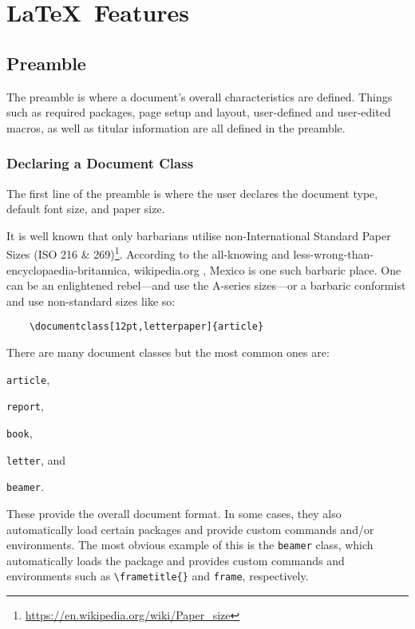 \chapter{\LaTeX~Features}
%
\section{Preamble}\label{s:p}
%
The preamble is where a document's overall characteristics are
defined.  Things such as required packages, page setup and layout,
user-defined and user-edited macros, as well as titular information
are all defined in the preamble.
%
\subsection{Declaring a Document Class}
%
The first line of the preamble is where the user declares the document
type, default font size, and paper size.

It is well known that only barbarians utilise non-International
Standard Paper Sizes (ISO 216 \&
269)\footnote{\url{https://en.wikipedia.org/wiki/Paper_size}}.
According to the all-knowing and
less-wrong-than-encyclopaedia-britannica, wikipedia.org
\cite{wikipediavsbritannica1,wikipediavsbritannica2,wikipediavsbritannica3},
Mexico is one such barbaric place.  One can be an enlightened
rebel---and use the A-series sizes---or a barbaric conformist and use
non-standard sizes like so:
\begin{verbatim}
	\documentclass[12pt,letterpaper]{article}
\end{verbatim}

There are many document classes but the most common ones are:
\begin{inparaenum}[\itshape 1\upshape)]
\item \verb|article|,
\item \verb|report|,
\item \verb|book|,
\item \verb|letter|, and
\item \verb|beamer|.
\end{inparaenum}
These provide the overall document format.  In some cases, they also
automatically load certain packages and provide custom commands and/or
environments.  The most obvious example of this is the \verb|beamer|
class, which automatically loads the  package and
provides custom commands and environments such as \verb|\frametitle{}|
and \verb|frame|, respectively.


